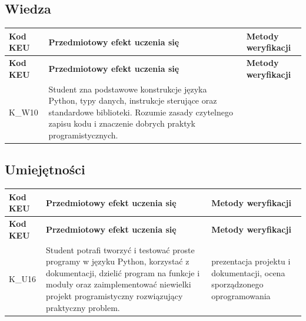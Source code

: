 \documentclass[12pt, a4paper]{article}
\newcommand{\thdrule}{\noalign{\global\setlength{\extrarowheight}{0pt}}}
\newcommand{\thdend}{\noalign{\global\setlength{\extrarowheight}{3pt}}}
\begin{document}
\subsection*{Wiedza}
{\scriptsize
\begin{longtable}{m{1.6cm}m{9.0cm}m{4.2cm}}
\thdrule\toprule
\rowcolor{pjatkRed} {\color{white}\footnotesize\textbf{\vphantom{Ag}Kod KEU}} & {\color{white}\footnotesize\textbf{\vphantom{Ag}Przedmiotowy efekt uczenia się}} & {\color{white}\footnotesize\textbf{\vphantom{Ag}Metody weryfikacji}} \\
\midrule\thdend
\endfirsthead
\thdrule\toprule
\rowcolor{pjatkRed} {\color{white}\footnotesize\textbf{\vphantom{Ag}Kod KEU}} & {\color{white}\footnotesize\textbf{\vphantom{Ag}Przedmiotowy efekt uczenia się}} & {\color{white}\footnotesize\textbf{\vphantom{Ag}Metody weryfikacji}} \\
\midrule\thdend
\endhead
  \rowcolor{tableRowLight} K\_W10 & Student zna podstawowe konstrukcje języka Python, typy danych, instrukcje sterujące oraz standardowe biblioteki. Rozumie zasady czytelnego zapisu kodu i znaczenie dobrych praktyk programistycznych. &  \\
\bottomrule
\end{longtable}}

\subsection*{Umiejętności}
{\scriptsize
\begin{longtable}{m{1.6cm}m{9.0cm}m{4.2cm}}
\thdrule\toprule
\rowcolor{pjatkRed} {\color{white}\footnotesize\textbf{\vphantom{Ag}Kod KEU}} & {\color{white}\footnotesize\textbf{\vphantom{Ag}Przedmiotowy efekt uczenia się}} & {\color{white}\footnotesize\textbf{\vphantom{Ag}Metody weryfikacji}} \\
\midrule\thdend
\endfirsthead
\thdrule\toprule
\rowcolor{pjatkRed} {\color{white}\footnotesize\textbf{\vphantom{Ag}Kod KEU}} & {\color{white}\footnotesize\textbf{\vphantom{Ag}Przedmiotowy efekt uczenia się}} & {\color{white}\footnotesize\textbf{\vphantom{Ag}Metody weryfikacji}} \\
\midrule\thdend
\endhead
  \rowcolor{tableRowLight} K\_U16 & Student potrafi tworzyć i testować proste programy w języku Python, korzystać z dokumentacji, dzielić program na funkcje i moduły oraz zaimplementować niewielki projekt programistyczny rozwiązujący praktyczny problem. & prezentacja projektu i dokumentacji, ocena sporządzonego oprogramowania \\
\bottomrule
\end{longtable}}
\end{document}
